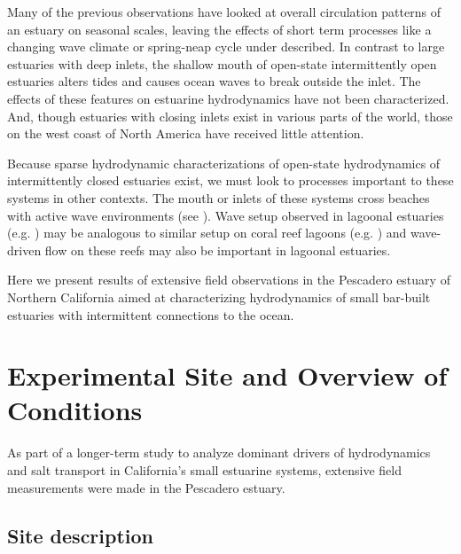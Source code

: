 Many of the previous observations have looked at overall circulation
patterns of an estuary on seasonal scales, leaving the effects of
short term processes like a changing wave climate or spring-neap
cycle under described. In contrast to large estuaries with deep
inlets, the shallow mouth of open-state intermittently open estuaries
alters tides and causes ocean waves to break outside the inlet. The
effects of these features on estuarine hydrodynamics have not been
characterized. And, though estuaries with closing inlets exist in
various parts of the world, those on the west coast of North America
have received little attention. 

Because sparse hydrodynamic characterizations of open-state hydrodynamics
of intermittently closed estuaries exist, we must look to processes
important to these systems in other contexts. The mouth or inlets
of these systems cross beaches with active wave environments (see
\cite{mei_surface_1993,battjes_surf-zone_1988}). Wave setup observed in lagoonal
estuaries (e.g. \cite{malhadas_effect_2009}) may be analogous
to similar setup on coral reef lagoons (e.g. \cite{becker_water_2014})
and wave-driven flow on these reefs \parencite{monismith_hydrodynamics_2007} may also
be important in lagoonal estuaries. 

Here we present results of extensive field observations in the Pescadero
estuary of Northern California aimed at characterizing hydrodynamics
of small bar-built estuaries with intermittent connections to the
ocean. 



\section{Experimental Site and Overview of Conditions}

As part of a longer-term study to analyze dominant drivers of hydrodynamics
and salt transport in California's small estuarine systems, extensive
field measurements were made in the Pescadero estuary.


\subsection{Site description }

